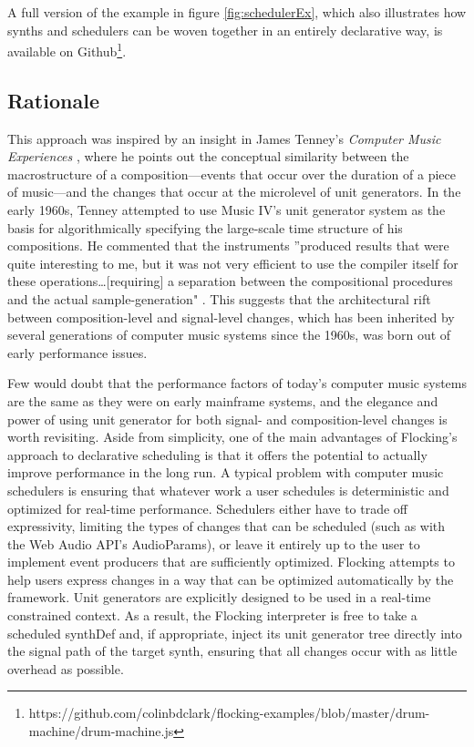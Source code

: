 \documentclass{article}
\begin{document}
A full version of the example in figure \ref{fig:schedulerEx}, which also illustrates how synths and schedulers can be woven together in an entirely declarative way, is available on Github\footnote{https://github.com/colinbdclark/flocking-examples/blob/master/drum-machine/drum-machine.js}.

\subsection{Rationale}

This approach was inspired by an insight in James Tenney's {\it Computer Music Experiences} \cite{tenney1969computer}, where he points out the conceptual similarity between the macrostructure of a composition---events that occur over the duration of a piece of music---and the changes that occur at the microlevel of unit generators. In the early 1960s, Tenney attempted to use Music IV's unit generator system as the basis for algorithmically specifying the large-scale time structure of his compositions. He commented that the instruments ''produced results that were quite interesting to me, but it was not very efficient to use the compiler itself for these operations\ldots [requiring] a separation between the compositional procedures and the actual sample-generation" \cite[p.41--42]{tenney1969computer}. This suggests that the architectural rift between composition-level and signal-level changes, which has been inherited by several generations of computer music systems since the 1960s, was born out of early performance issues.

Few would doubt that the performance factors of today's computer music systems are the same as they were on early mainframe systems, and the elegance and power of using unit generator for both signal- and composition-level changes is worth revisiting. Aside from simplicity, one of the main advantages of Flocking's approach to declarative scheduling is that it offers the potential to actually improve performance in the long run. A typical problem with computer music schedulers is ensuring that whatever work a user schedules is deterministic and optimized for real-time performance. Schedulers either have to trade off expressivity, limiting the types of changes that can be scheduled (such as with the Web Audio API's AudioParams), or leave it entirely up to the user to implement event producers that are sufficiently optimized. Flocking attempts to help users express changes in a way that can be optimized automatically by the framework. Unit generators are explicitly designed to be used in a real-time constrained context. As a result, the Flocking interpreter is free to take a scheduled synthDef and, if appropriate, inject its unit generator tree directly into the signal path of the target synth, ensuring that all changes occur with as little overhead as possible.
\end{document}
